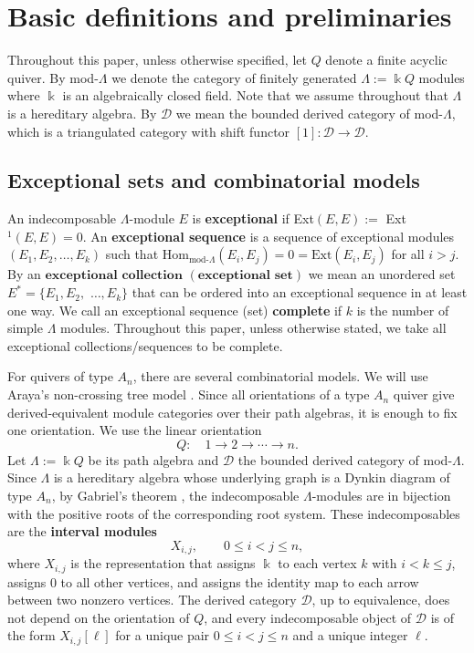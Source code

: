 \documentclass[12pt]{amsart}
\theoremstyle{definition}
\theoremstyle{remark}
\numberwithin{equation}{section}
\newcommand{\kk}{\ensuremath{\Bbbk}}
\newcommand{\cD}{\ensuremath{{\mathcal{D}}}}
\begin{document}
\section{Basic definitions and preliminaries}\label{sec1}

Throughout this paper, unless otherwise specified, let $Q$ denote a finite acyclic quiver. By mod-$\Lambda$ we denote the category of finitely generated $\Lambda:=\kk Q$ modules where $\kk$ is an algebraically closed field. Note that we assume throughout that $\Lambda$ is a hereditary algebra. By $\cD$ we mean the bounded derived category of mod-$\Lambda$, which is a triangulated category with shift functor $[1]:\cD \rightarrow \cD$. 

\subsection{Exceptional sets and combinatorial models}\label{subsec: geom models}

An indecomposable $\Lambda$-module $E$ is \textbf{exceptional} if Ext$(E,E) := $ Ext$^1(E,E) = 0$. An \textbf{exceptional sequence} is a sequence of exceptional modules $(E_1, E_2, \dots, E_k)$ such that Hom$_{\text{mod-}\Lambda}(E_i,E_j) = 0 = \text{Ext}(E_i,E_j)$ for all $i>j$. By an $\textbf{exceptional collection }   (\textbf{exceptional set})$ we mean an unordered set $E^*=\{E_1,E_2,$ $ \dots,E_k\}$ that can be ordered into an exceptional sequence in at least one way. We call an exceptional sequence (set) \textbf{complete} if $k$ is the number of simple $\Lambda$ modules. Throughout this paper, unless otherwise stated, we take all exceptional collections/sequences to be complete.

For quivers of type $A_n$, there are several combinatorial models. We will use Araya's non-crossing tree model \cite{araya2013exceptional}. Since all orientations of a type $A_n$ quiver give derived-equivalent module categories over their path algebras, it is enough to fix one orientation. We use the linear orientation
\[
Q:\quad 1 \longrightarrow 2 \longrightarrow \cdots \longrightarrow n.
\]
Let $\Lambda := \kk Q$ be its path algebra and $\cD$ the bounded derived category of mod-$\Lambda$. Since $\Lambda$ is a hereditary algebra whose underlying graph is a Dynkin diagram of type $A_n$, by Gabriel's theorem \cite{gabriel1972unzerlegbare}, the indecomposable $\Lambda$-modules are in bijection with the positive roots of the corresponding root system. These indecomposables are the \textbf{interval modules}
\[
X_{i,j}, \qquad 0 \le i < j \le n,
\]
where $X_{i,j}$ is the representation that assigns $\kk$ to each vertex $k$ with $i < k \le j$, assigns $0$ to all other vertices, and assigns the identity map to each arrow between two nonzero vertices. The derived category $\cD$, up to equivalence, does not depend on the orientation of $Q$, and every indecomposable object of $\cD$ is of the form $X_{i,j}[\ell]$ for a unique pair $0 \le i < j \le n$ and a unique integer $\ell$.
\end{document}
